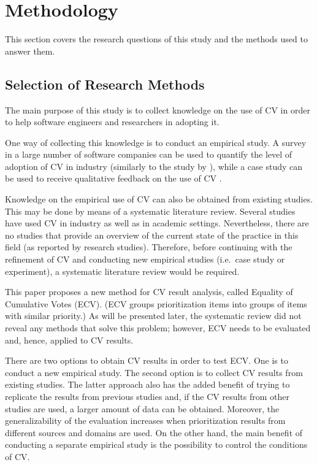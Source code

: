 \section{Methodology\label{methodology}}

This section covers the research questions of this study and the methods used to answer them.

\subsection{Selection of Research Methods}

The main purpose of this study is to collect knowledge on the use of CV in order to help software engineers and researchers in adopting it.%

One way of collecting this knowledge is to conduct an empirical study. A
survey in a large number of software companies can be used to quantify the
level of adoption of CV in industry (similarly to the study by \cite{Zahedi1986}), while a case study can be used to receive qualitative feedback on the use of CV
\cite{Runeson2008}.

Knowledge on the empirical use of CV can also be obtained from existing
studies. This may be done by means of a systematic literature review. Several
studies have used CV in industry as well as in academic settings.
Nevertheless, there are no studies that provide an overview of the current state
of the practice in this field (as reported by research studies). 
Therefore, before continuing with the refinement of CV and conducting new 
empirical studies (i.e.\ case study or experiment), a systematic literature review would 
be required.

This paper proposes a new method for CV result analysis, called Equality of Cumulative Votes (ECV).
(ECV groups prioritization items into groups of items with similar priority.)
As will be presented later, the systematic review did not reveal any methods that solve this problem; however, ECV needs to be evaluated and, hence, applied to CV results.

There are two options to obtain CV results in order to test ECV. One is to conduct a new empirical study. The second option is to collect CV results from existing studies. The latter approach also has the added benefit of trying to replicate the results from previous studies and, if the CV results from other studies are used, a larger amount of data can be obtained. Moreover, the generalizability of the evaluation increases when prioritization results from different sources and domains are used.
On the other hand, the main benefit of conducting a separate empirical study is the possibility to control the conditions of CV.

